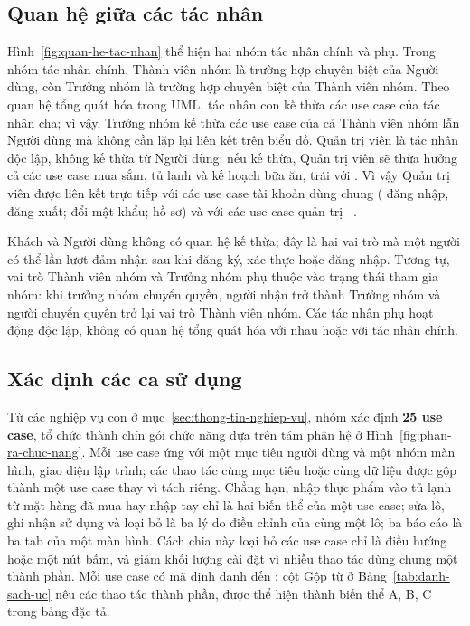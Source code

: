 \subsection{Quan hệ giữa các tác nhân}\label{ssec:quan-he-tac-nhan}

Hình~\ref{fig:quan-he-tac-nhan} thể hiện hai nhóm tác nhân chính và phụ. Trong nhóm tác nhân chính, Thành viên nhóm là trường hợp chuyên biệt của Người dùng, còn Trưởng nhóm là trường hợp chuyên biệt của Thành viên nhóm. Theo quan hệ tổng quát hóa trong UML, tác nhân con kế thừa các use case của tác nhân cha; vì vậy, Trưởng nhóm kế thừa các use case của cả Thành viên nhóm lẫn Người dùng mà không cần lặp lại liên kết trên biểu đồ. Quản trị viên là tác nhân độc lập, không kế thừa từ Người dùng: nếu kế thừa, Quản trị viên sẽ thừa hưởng cả các use case mua sắm, tủ lạnh và kế hoạch bữa ăn, trái với . Vì vậy Quản trị viên được liên kết trực tiếp với các use case tài khoản dùng chung ( đăng nhập, đăng xuất;  đổi mật khẩu;  hồ sơ) và với các use case quản trị --.


Khách và Người dùng không có quan hệ kế thừa; đây là hai vai trò mà một người có thể lần lượt đảm nhận sau khi đăng ký, xác thực hoặc đăng nhập. Tương tự, vai trò Thành viên nhóm và Trưởng nhóm phụ thuộc vào trạng thái tham gia nhóm: khi trưởng nhóm chuyển quyền, người nhận trở thành Trưởng nhóm và người chuyển quyền trở lại vai trò Thành viên nhóm. Các tác nhân phụ hoạt động độc lập, không có quan hệ tổng quát hóa với nhau hoặc với tác nhân chính.

\subsection{Xác định các ca sử dụng}\label{ssec:danh-sach-uc}

Từ các nghiệp vụ con ở mục~\ref{sec:thong-tin-nghiep-vu}, nhóm xác định \textbf{25 use case}, tổ chức thành chín gói chức năng dựa trên tám phân hệ ở Hình~\ref{fig:phan-ra-chuc-nang}. Mỗi use case ứng với một mục tiêu người dùng và một nhóm màn hình, giao diện lập trình; các thao tác cùng mục tiêu hoặc cùng dữ liệu được gộp thành một use case thay vì tách riêng. Chẳng hạn, nhập thực phẩm vào tủ lạnh từ mặt hàng đã mua hay nhập tay chỉ là hai biến thể của một use case; sửa lô, ghi nhận sử dụng và loại bỏ là ba lý do điều chỉnh của cùng một lô; ba báo cáo là ba tab của một màn hình. Cách chia này loại bỏ các use case chỉ là điều hướng hoặc một nút bấm, và giảm khối lượng cài đặt vì nhiều thao tác dùng chung một thành phần. Mỗi use case có mã định danh  đến ; cột Gộp từ ở Bảng~\ref{tab:danh-sach-uc} nêu các thao tác thành phần, được thể hiện thành biến thể A, B, C trong bảng đặc tả.

